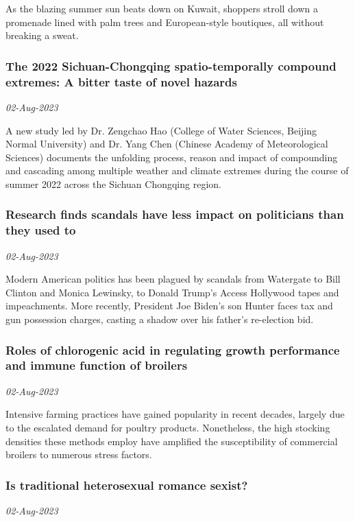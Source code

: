 As the blazing summer sun beats down on Kuwait, shoppers stroll down a promenade lined with palm trees and European-style boutiques, all without breaking a sweat.
\subsubsection{The 2022 Sichuan-Chongqing spatio-temporally compound extremes: A bitter taste of novel hazards \href{https://phys.org/news/2023-08-sichuan-chongqing-spatio-temporally-compound-extremes-bitter.html}{}}
\textit{02-Aug-2023}

A new study led by Dr. Zengchao Hao (College of Water Sciences, Beijing Normal University) and Dr. Yang Chen (Chinese Academy of Meteorological Sciences) documents the unfolding process, reason and impact of compounding and cascading among multiple weather and climate extremes during the course of summer 2022 across the Sichuan Chongqing region.
\subsubsection{Research finds scandals have less impact on politicians than they used to \href{https://phys.org/news/2023-08-scandals-impact-politicians.html}{}}
\textit{02-Aug-2023}

Modern American politics has been plagued by scandals from Watergate to Bill Clinton and Monica Lewinsky, to Donald Trump's Access Hollywood tapes and impeachments. More recently, President Joe Biden's son Hunter faces tax and gun possession charges, casting a shadow over his father's re-election bid.
\subsubsection{Roles of chlorogenic acid in regulating growth performance and immune function of broilers \href{https://phys.org/news/2023-08-roles-chlorogenic-acid-growth-immune.html}{}}
\textit{02-Aug-2023}

Intensive farming practices have gained popularity in recent decades, largely due to the escalated demand for poultry products. Nonetheless, the high stocking densities these methods employ have amplified the susceptibility of commercial broilers to numerous stress factors.
\subsubsection{Is traditional heterosexual romance sexist? \href{https://phys.org/news/2023-08-traditional-heterosexual-romance-sexist.html}{}}
\textit{02-Aug-2023}

